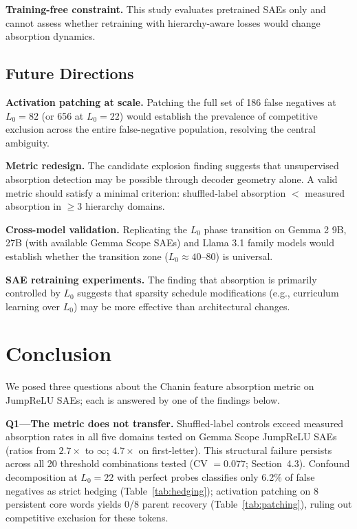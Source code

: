 \documentclass{article}
\begin{document}
\textbf{Training-free constraint.} This study evaluates pretrained SAEs only and cannot assess whether retraining with hierarchy-aware losses would change absorption dynamics.

\subsection{Future Directions}

\textbf{Activation patching at scale.} Patching the full set of 186 false negatives at $L_0 = 82$ (or 656 at $L_0 = 22$) would establish the prevalence of competitive exclusion across the entire false-negative population, resolving the central ambiguity.

\textbf{Metric redesign.} The candidate explosion finding suggests that unsupervised absorption detection may be possible through decoder geometry alone. A valid metric should satisfy a minimal criterion: shuffled-label absorption $<$ measured absorption in $\geq 3$ hierarchy domains.

\textbf{Cross-model validation.} Replicating the $L_0$ phase transition on Gemma 2 9B, 27B (with available Gemma Scope SAEs) and Llama 3.1 family models would establish whether the transition zone ($L_0 \approx 40$--$80$) is universal.

\textbf{SAE retraining experiments.} The finding that absorption is primarily controlled by $L_0$ suggests that sparsity schedule modifications (e.g., curriculum learning over $L_0$) may be more effective than architectural changes.


\section{Conclusion}

We posed three questions about the Chanin feature absorption metric on JumpReLU SAEs; each is answered by one of the findings below.

\textbf{Q1---The metric does not transfer.} Shuffled-label controls exceed measured absorption rates in all five domains tested on Gemma Scope JumpReLU SAEs (ratios from $2.7\times$ to $\infty$; $4.7\times$ on first-letter). This structural failure persists across all 20 threshold combinations tested (CV $= 0.077$; Section~4.3). Confound decomposition at $L_0 = 22$ with perfect probes classifies only 6.2\% of false negatives as strict hedging (Table~\ref{tab:hedging}); activation patching on 8 persistent core words yields 0/8 parent recovery (Table~\ref{tab:patching}), ruling out competitive exclusion for these tokens.
\end{document}
